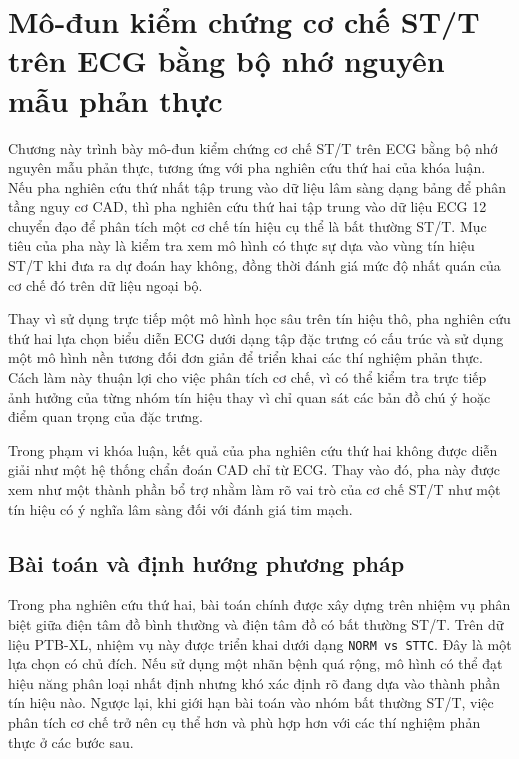 \clearpage
{}

\setcounter{chapter}{2}
\chapter[{MÔ-ĐUN KIỂM CHỨNG CƠ CHẾ ST/T TRÊN ECG BẰNG BỘ NHỚ NGUYÊN MẪU PHẢN THỰC}]{Mô-đun kiểm chứng cơ chế ST/T trên ECG bằng bộ nhớ nguyên mẫu phản thực}

Chương này trình bày mô-đun kiểm chứng cơ chế ST/T trên ECG bằng bộ nhớ nguyên mẫu phản thực, tương ứng với pha nghiên cứu thứ hai của khóa luận. Nếu pha nghiên cứu thứ nhất tập trung vào dữ liệu lâm sàng dạng bảng để phân tầng nguy cơ CAD, thì pha nghiên cứu thứ hai tập trung vào dữ liệu ECG 12 chuyển đạo để phân tích một cơ chế tín hiệu cụ thể là bất thường ST/T. Mục tiêu của pha này là kiểm tra xem mô hình có thực sự dựa vào vùng tín hiệu ST/T khi đưa ra dự đoán hay không, đồng thời đánh giá mức độ nhất quán của cơ chế đó trên dữ liệu ngoại bộ.

\blocksep

Thay vì sử dụng trực tiếp một mô hình học sâu trên tín hiệu thô, pha nghiên cứu thứ hai lựa chọn biểu diễn ECG dưới dạng tập đặc trưng có cấu trúc và sử dụng một mô hình nền tương đối đơn giản để triển khai các thí nghiệm phản thực. Cách làm này thuận lợi cho việc phân tích cơ chế, vì có thể kiểm tra trực tiếp ảnh hưởng của từng nhóm tín hiệu thay vì chỉ quan sát các bản đồ chú ý hoặc điểm quan trọng của đặc trưng.

\blocksep

Trong phạm vi khóa luận, kết quả của pha nghiên cứu thứ hai không được diễn giải như một hệ thống chẩn đoán CAD chỉ từ ECG. Thay vào đó, pha này được xem như một thành phần bổ trợ nhằm làm rõ vai trò của cơ chế ST/T như một tín hiệu có ý nghĩa lâm sàng đối với đánh giá tim mạch.

\section{Bài toán và định hướng phương pháp}

\blocksep

Trong pha nghiên cứu thứ hai, bài toán chính được xây dựng trên nhiệm vụ phân biệt giữa điện tâm đồ bình thường và điện tâm đồ có bất thường ST/T. Trên dữ liệu PTB-XL, nhiệm vụ này được triển khai dưới dạng \texttt{NORM vs STTC}. Đây là một lựa chọn có chủ đích. Nếu sử dụng một nhãn bệnh quá rộng, mô hình có thể đạt hiệu năng phân loại nhất định nhưng khó xác định rõ đang dựa vào thành phần tín hiệu nào. Ngược lại, khi giới hạn bài toán vào nhóm bất thường ST/T, việc phân tích cơ chế trở nên cụ thể hơn và phù hợp hơn với các thí nghiệm phản thực ở các bước sau.

